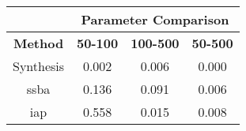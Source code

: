 \begin{tabular}{|c|c|c|c|}
	\cline{2-4}
	\multicolumn{1}{c|}{} & \multicolumn{3}{c|}{\bf{Parameter Comparison}} \tabularnewline
	\hline
	\bf{Method} & \bf{50-100} & \bf{100-500} & \bf{50-500} \tabularnewline
	\hline
	\hline
	Synthesis & 0.002 & 0.006 & 0.000 \tabularnewline
	\hline
	\acrshort{ssba} & 0.136 & 0.091 & 0.006 \tabularnewline
	\hline
	\acrshort{iap} & 0.558 & 0.015 & 0.008 \tabularnewline
	\hline
\end{tabular}
